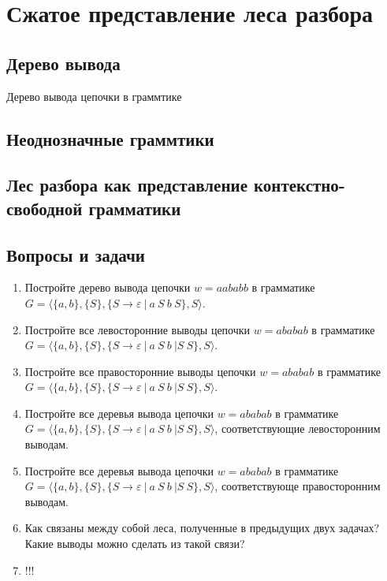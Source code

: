 \section{Сжатое представление леса разбора}

\subsection{Дерево вывода}

Дерево вывода цепочки в граммтике

\subsection{Неоднозначные граммтики}

\subsection{Лес разбора как представление контекстно-свободной грамматики}

\subsection{Вопросы и задачи}
\begin{enumerate}
  \item Постройте дерево вывода цепочки $w=aababb$ в грамматике $G=\langle\{a,b\},\{S\},\{S\rightarrow \varepsilon \ | \ a \ S \ b \ S \}, S \rangle$.
  \item Постройте все левосторонние выводы цепочки $w=ababab$ в грамматике $G=\langle\{a,b\},\{S\},\{S\rightarrow \varepsilon \ | \ a \ S \ b \ | S \ S\}, S \rangle$.
  \item Постройте все правосторонние выводы цепочки $w=ababab$ в грамматике $G=\langle\{a,b\},\{S\},\{S\rightarrow \varepsilon \ | \ a \ S \ b \ | S \ S\}, S \rangle$.
  \item Постройте все деревья вывода цепочки $w=ababab$ в грамматике $G=\langle\{a,b\},\{S\},\{S\rightarrow \varepsilon \ | \ a \ S \ b \ | S \ S\}, S \rangle$, соответствующие левосторонним выводам.
  \item Постройте все деревья вывода цепочки $w=ababab$ в грамматике $G=\langle\{a,b\},\{S\},\{S\rightarrow \varepsilon \ | \ a \ S \ b \ | S \ S\}, S \rangle$, соответствующе правосторонним выводам.
  \item Как связаны между собой леса, полученные в предыдущих двух задачах? Какие выводы можно сделать из такой связи?
  \item !!!
\end{enumerate}

